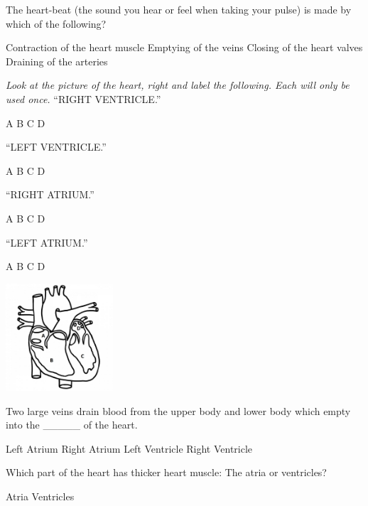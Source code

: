 \documentclass[11.5pt]{exam}
\begin{document}
\begin{questions}
\question The heart-beat (the sound you hear or feel when taking your pulse) is made by which of the following?
\begin{choices}
 \choice Contraction of the heart muscle
 \choice Emptying of the veins
 \choice Closing of the heart valves
 \choice Draining of the arteries
\end{choices}

\begin{multicols}{2}
\textit{Look at the picture of the heart, right and label the following. Each will only be used once.}
\question ``RIGHT VENTRICLE.''

\begin{oneparchoices}
 \choice A
 \choice B
 \choice C
 \choice D
\end{oneparchoices}
\question ``LEFT VENTRICLE.''

\begin{oneparchoices}
 \choice A
 \choice B
 \choice C
 \choice D
\end{oneparchoices}
\question ``RIGHT ATRIUM.''

\begin{oneparchoices}
 \choice A
 \choice B
 \choice C
 \choice D
\end{oneparchoices}
\question ``LEFT ATRIUM.''

\begin{oneparchoices}
 \choice A
 \choice B
 \choice C
 \choice D
\end{oneparchoices}
\columnbreak

\includegraphics[width=0.3\textwidth]{quiz/heartmulti.jpg}
\end{multicols}

\question Two large veins drain blood from the upper body and lower body which empty into the \_\_\_\_\_ of the heart.
\begin{choices}
 \choice Left Atrium
 \choice Right Atrium
 \choice Left Ventricle
 \choice Right Ventricle
\end{choices}

\question Which part of the heart has thicker heart muscle:  The atria or ventricles?
\begin{choices}
 \choice Atria
 \choice Ventricles
\end{choices}


\end{questions}
\end{document}
